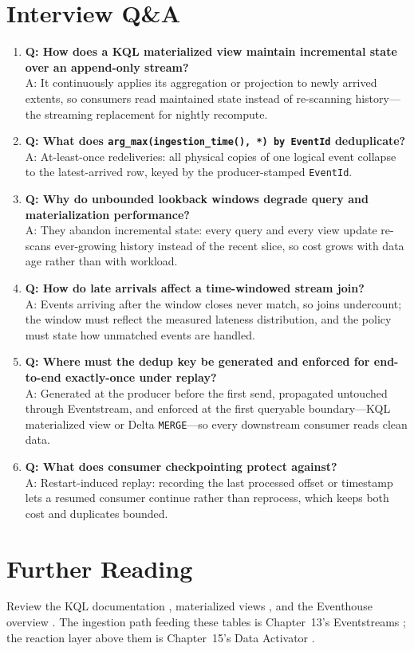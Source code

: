 \section{Interview Q\&A}
\begin{enumerate}
    \item \textbf{Q: How does a KQL materialized view maintain incremental state over an append-only stream?}\\
    A: It continuously applies its aggregation or projection to newly arrived extents, so consumers read maintained state instead of re-scanning history---the streaming replacement for nightly recompute.
    \item \textbf{Q: What does \texttt{arg\_max(ingestion\_time(), *) by EventId} deduplicate?}\\
    A: At-least-once redeliveries: all physical copies of one logical event collapse to the latest-arrived row, keyed by the producer-stamped \texttt{EventId}.
    \item \textbf{Q: Why do unbounded lookback windows degrade query and materialization performance?}\\
    A: They abandon incremental state: every query and every view update re-scans ever-growing history instead of the recent slice, so cost grows with data age rather than with workload.
    \item \textbf{Q: How do late arrivals affect a time-windowed stream join?}\\
    A: Events arriving after the window closes never match, so joins undercount; the window must reflect the measured lateness distribution, and the policy must state how unmatched events are handled.
    \item \textbf{Q: Where must the dedup key be generated and enforced for end-to-end exactly-once under replay?}\\
    A: Generated at the producer before the first send, propagated untouched through Eventstream, and enforced at the first queryable boundary---KQL materialized view or Delta \texttt{MERGE}---so every downstream consumer reads clean data.
    \item \textbf{Q: What does consumer checkpointing protect against?}\\
    A: Restart-induced replay: recording the last processed offset or timestamp lets a resumed consumer continue rather than reprocess, which keeps both cost and duplicates bounded.
\end{enumerate}

\section{Further Reading}
Review the KQL documentation \cite{microsoftKQL}, materialized views \cite{microsoftKQLMV}, and the Eventhouse overview \cite{microsoftFabricEventhouse}. The ingestion path feeding these tables is Chapter~13's Eventstreams \cite{microsoftFabricEventstreams}; the reaction layer above them is Chapter~15's Data Activator \cite{microsoftDataActivator}.

